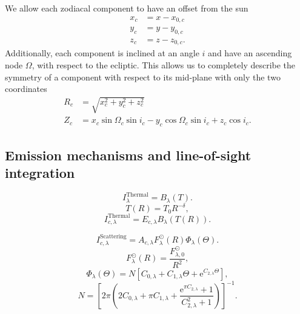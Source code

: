 \documentclass{aa}
\begin{document}
We allow each zodiacal component to have an offset from the sun
\begin{equation}
    \begin{aligned}
    x_c&= x - x_{0,c}\\
    y_c&= y - y_{0,c}\\
    z_c&= z - z_{0,c}.
    \end{aligned}
\end{equation}
Additionally, each component is inclined at an angle $i$ and have an ascending node $\Omega$, with respect to the ecliptic. This allows us to completely describe the symmetry of a component with respect to its mid-plane with only the two coordinates
\begin{align}
    R_c &= \sqrt{x_c^2 + y_c^2 + z_c^2}\\
    Z_c &= x_c\sin{\Omega_c}\sin{i_c} - y_c \cos{\Omega_c}\sin{i_c} + z_c \cos{i_c}.
\end{align}

\subsection{Emission mechanisms and line-of-sight integration}

\begin{equation}
    I^\mathrm{Thermal}_{\lambda} = B_\lambda(T).
\end{equation}
\begin{equation}
    T(R) = T_0 R^{-\delta},
\end{equation}
\begin{equation}
    I^\mathrm{Thermal}_{c,\lambda} = E_{c,\lambda} B_\lambda(T(R)).
\end{equation}

\begin{equation}\label{eq: scat_term}
    I^\mathrm{Scattering}_{c, \lambda} = A_{c, \lambda} F_\lambda^\odot(R) \Phi_\lambda(\Theta).
\end{equation}
\begin{equation}
    F_\lambda^\odot(R) = \frac{F_{\lambda,0}^\odot}{R^2},
\end{equation}
\begin{equation}
    \Phi_{\lambda}(\Theta)=N\left[C_{0, \lambda}+C_
    {1, \lambda} \Theta+\mathrm{e}^{C_{2, \lambda} \Theta}\right],
\end{equation}
\begin{equation}
    N = \left[ 2\pi \left( 2 C_{0, \lambda} + \pi C_{1, \lambda} + \frac{\mathrm{e}^{\pi C_{2, \lambda}} + 1}{{C^2_{2, \lambda}} + 1} \right)\right]^{-1}.
\end{equation}
\end{document}
